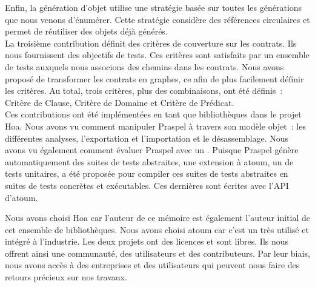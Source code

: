 Enfin, la génération d'objet utilise une stratégie basée sur toutes les
générations que nous venons d'énumérer. Cette stratégie considère des références
circulaires et permet de réutiliser des objets déjà générés. \\

La troisième contribution définit des critères de couverture sur les contrats.
Ils nous fournissent des objectifs de tests. Ces critères sont satisfaits par un
ensemble de tests auxquels nous associons des chemins dans les contrats. Nous
avons proposé de transformer les contrats en graphes, ce afin de plus facilement
définir les critères. Au total, trois critères, plus des combinaisons, ont été
définis~: Critère de Clause, Critère de Domaine et Critère de Prédicat. \\

Ces contributions ont été implémentées en tant que bibliothèques dans le projet
Hoa. Nous avons vu comment manipuler Praspel à travers son modèle objet~: les
différentes analyses, l'exportation et l'importation et le désassemblage. Nous
avons vu également comment évaluer Praspel avec un . Puisque Praspel génère automatiquement des suites de tests
abstraites, une extension à atoum, un  de tests unitaires,
a été proposée pour compiler ces suites de tests abstraites en suites de tests
concrètes et exécutables. Ces dernières sont écrites avec l'API d'atoum.

Nous avons choisi Hoa car l'auteur de ce mémoire est également l'auteur initial
de cet ensemble de bibliothèques. Nous avons choisi atoum car c'est un
 très utilisé et intégré à l'industrie. Les deux projets
ont des licences  et sont libres. Ils nous offrent ainsi
une communauté, des utilisateurs et des contributeurs. Par leur biais, nous
avons accès à des entreprises et des utilisateurs qui peuvent nous faire des
retours précieux sur nos travaux. \\

